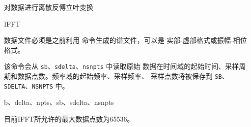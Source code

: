 \label{cmd:ifft}

对数据进行离散反傅立叶变换

\begin{SACSTX}
IFFT
\end{SACSTX}

数据文件必须是之前利用  命令生成的谱文件，可以是
实部-虚部格式或振幅-相位格式。

该命令会从 \texttt{sb}、\texttt{sdelta}、\texttt{nsnpts} 中读取原始
数据在时间域的起始时间、采样周期和数据点数。频率域的起始频率、采样频率、
采样点数将被保存到 \texttt{SB}、\texttt{SDELTA}、\texttt{NSNPTS} 中。

b、delta、npts、sb、sdelta、nsnpts

目前IFFT所允许的最大数据点数为65536。
